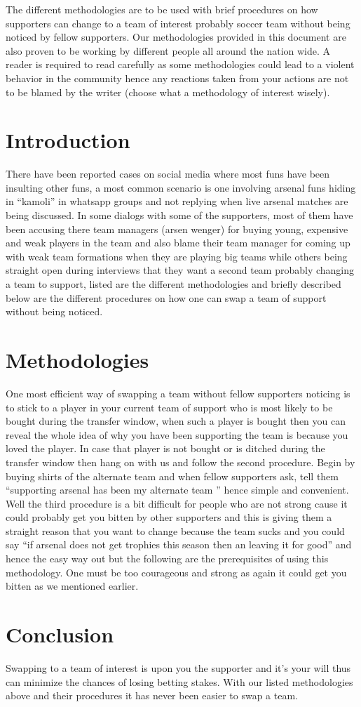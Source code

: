 \documentclass[14pt]{article}
\begin{document}
				The different methodologies are to be used with brief procedures on how supporters can change to a team of interest probably soccer team without being noticed by fellow supporters.
Our methodologies provided in this document are also proven to be working by different people all around the nation wide. A reader is required to read carefully as some methodologies could lead to a violent behavior in the community hence any reactions taken from your actions are not to be blamed by the writer (choose what a methodology of interest wisely).

			\section{Introduction}

				There have been reported cases on social media where most funs have been insulting other funs, a most common scenario is one involving arsenal funs hiding in “kamoli” in whatsapp groups and not replying when live arsenal matches are being discussed.
In some dialogs with some of the supporters, most of them have been accusing there team managers (arsen wenger) for buying young, expensive and weak players in the team and also blame their team manager for coming up with weak team formations when they are playing big teams while others being straight open during interviews that they want a second team probably changing a team to support, listed are the different methodologies and briefly described below are the different procedures on how one can swap a team of support without being noticed.

			\section{Methodologies}

				One most efficient way of swapping a team without fellow supporters noticing is to stick to a player in your current team of support who is most likely to be bought during the transfer window, when such a player is bought then you can reveal the whole idea of  why you have been supporting the team is because you loved the player. In case that player is not bought or is ditched during the transfer window then hang on with us and follow the second procedure.
	Begin by buying shirts of the alternate team and when fellow supporters ask, tell them “supporting arsenal has been my alternate team ” hence simple and convenient.
	Well the third procedure is a bit difficult for people who are not strong cause it could probably get you bitten by other supporters and this is giving them a straight reason that you want to change because the team sucks and you could say “if arsenal does not get  trophies this season then an leaving it for good”  and hence the easy way out but the following are the prerequisites of using this methodology. One must be too courageous  and  strong  as again it could get you bitten as we mentioned earlier.

			\section{Conclusion}

				Swapping to a team of interest is upon you the supporter and it’s your will thus can minimize the chances of losing betting stakes. With our listed methodologies above and their procedures it has never been easier to swap a team.

	

	
\end{document}
